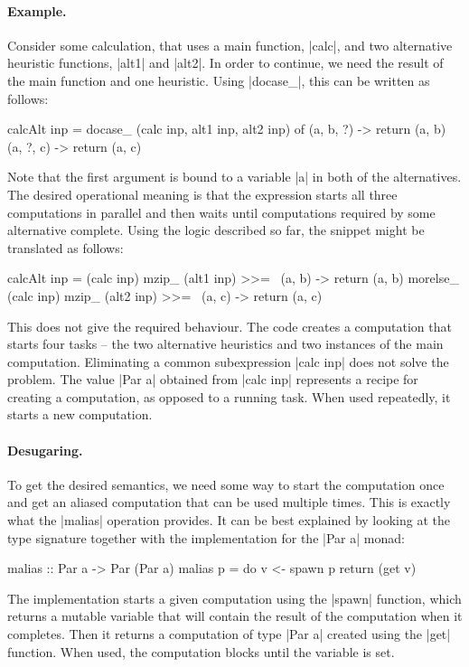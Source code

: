 \documentclass{sigplanconf}
\begin{document}
\paragraph{Example.} Consider some calculation, that uses a main function, |calc|, 
and two alternative heuristic functions, |alt1| and |alt2|. In order to continue, we need the 
result of the main function and one heuristic. Using |docase_|, this can be written as follows:

\begin{code}
calcAlt inp = docase_ (calc inp, alt1 inp, alt2 inp) of
  (a, b, ?) -> return (a, b)
  (a, ?, c) -> return (a, c)
\end{code}
Note that the first argument is bound to a variable |a| in both of the alternatives. The desired 
operational meaning is that the expression starts all three computations in parallel and then waits 
until computations required by some alternative complete. Using the logic described so far, the 
snippet might be translated as follows:

\begin{code}
calcAlt inp = 
  (calc inp) mzip_ (alt1 inp) >>= \ (a, b) -> return (a, b) morelse_
  (calc inp) mzip_ (alt2 inp) >>= \ (a, c) -> return (a, c)
\end{code}
This does not give the required behaviour. The code creates a computation that 
starts four tasks -- the two alternative heuristics and two instances of the main
computation. Eliminating a common subexpression |calc inp| does not solve the problem. The value 
|Par a| obtained from |calc inp| represents a recipe for creating a computation, as opposed to 
a running task. When used repeatedly, it starts a new computation.

\paragraph{Desugaring.} To get the desired semantics, we need some way to start the computation
once and get an aliased computation that can be used multiple times. This is exactly
what the |malias| operation provides. It can be best explained by looking at the type 
signature together with the implementation for the |Par a| monad:

\begin{code}
malias :: Par a -> Par (Par a)
malias p = do 
  v <- spawn p
  return (get v)
\end{code}
The implementation starts a given computation using the |spawn| function, which returns a 
mutable variable that will contain the result of the computation when it completes. Then 
it returns a computation of type |Par a| created using the |get| function. When used, the 
computation blocks until the variable is set.
\end{document}
